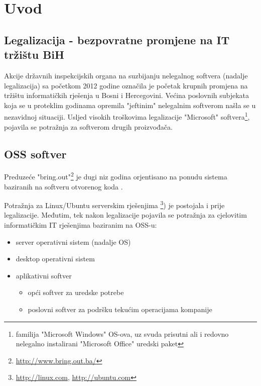 \documentclass[times, utf8, seminar]{fit}
\begin{document}

\chapter{Uvod}

\section{Legalizacija - bezpovratne promjene na IT tržištu BiH}

Akcije državnih inspekcijskih organa na suzbijanju nelegalnog softvera (nadalje legalizacija) sa početkom 2012 godine označila je početak krupnih promjena na tržištu informatičkih  rješenja u Bosni i Hercegovini. 
Većina poslovnih subjekata koja se u proteklim godinama opremila "jeftinim" nelegalnim softverom  našla se u nezavidnoj situaciji.
Usljed visokih troškovima legalizacije "Microsoft" softvera\footnote{familija "Microsoft Windows" OS-ova, uz svuda prisutni ali i redovno nelegalno instalirani "Microsoft Office" uredski paket}, pojavila se potražnja za softverom drugih proizvođača.  

\section{OSS softver}

Preduzeće "bring.out"\footnote{\url{http://www.bring.out.ba/}} je dugi niz godina orjentisano na ponudu sistema baziranih na softveru otvorenog koda .

Potražnja za Linux/Ubuntu serverskim rješenjima \footnote{\url{http://linux.com}, \url{http://ubuntu.com}}) je postojala i prije legalizacije. Međutim, tek nakon legalizacije pojavila se potražnja za cjelovitim informatičkim IT rješenjima baziranim na OSS-u:
\begin{itemize}
  \item server operativni sistem (nadalje OS)
  \item desktop operativni sistem
  \item aplikativni softver
  \begin{itemize}
    \item opći softver za uredske potrebe
    \item poslovni softver za podršku tekućim operacijama kompanije 
  \end{itemize}
\end{itemize}
\end{document}
